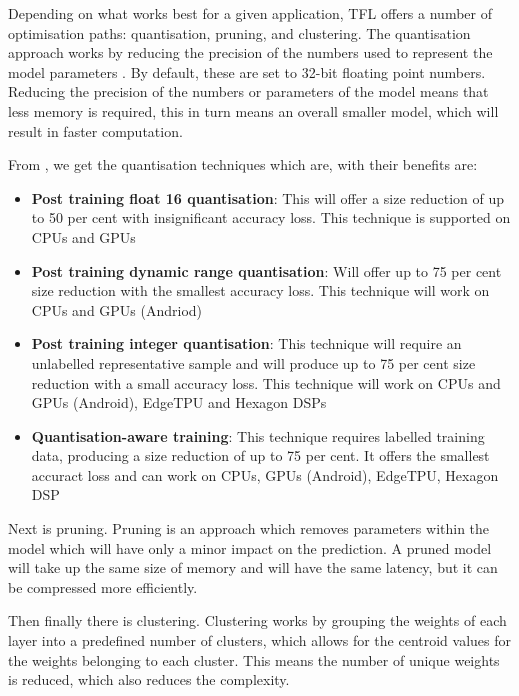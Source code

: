 \documentclass{svproc}
\begin{document}
Depending on what works best for a given application, TFL offers a number of optimisation paths: quantisation, pruning, and clustering. 
The quantisation approach works by reducing the precision of the numbers used to represent the model parameters \cite{b13}. By default, 
these are set to 32-bit floating point numbers. Reducing the precision of the numbers or parameters of the model means that less memory is 
required, this in turn means an overall smaller model, which will result in faster computation.

From \cite{b12}, we get the quantisation techniques which are, with their benefits are:

\begin{itemize}
    \item \textbf{Post training float 16 quantisation}: This will offer a size reduction of up to 50 per cent with insignificant accuracy loss. 
    This technique is supported on CPUs and GPUs
    \item \textbf{Post training dynamic range quantisation}: Will offer up to 75 per cent size reduction with the smallest accuracy loss. 
    This technique will work on CPUs and GPUs (Andriod)
    \item \textbf{Post training integer quantisation}: This technique will require an unlabelled representative sample and will produce 
    up to 75 per cent size reduction with a small accuracy loss. This technique will work on CPUs and GPUs (Android), EdgeTPU and Hexagon DSPs
    \item \textbf{Quantisation-aware training}: This technique requires labelled training data, producing a size reduction of up to 75 per cent. 
    It offers the smallest accuract loss and can work on CPUs, GPUs (Android), EdgeTPU, Hexagon DSP
\end{itemize}


Next is pruning. Pruning is an approach which removes parameters within the model which will have only a minor impact on the prediction. 
A pruned model will take up the same size of memory and will have the same latency, but it can be compressed more efficiently.

Then finally there is clustering. Clustering works by grouping the weights of each layer into a predefined number of clusters, 
which allows for the centroid values for the weights belonging to each cluster. This means the number of unique weights is reduced, 
which also reduces the complexity.
\end{document}
